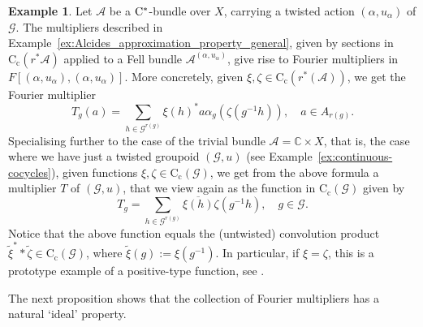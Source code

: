 \documentclass[11 pt, leqno]{amsart}
\numberwithin{equation}{section}
\theoremstyle{plain}
\theoremstyle{definition}
\newtheorem{ex}[thm]{Example}
\newcommand*{\contc}{\mathrm{C_c}}%
\newcommand{\G}{\mathcal G} %
\newcommand{\A}{\mathcal A}
\newcommand{\C}{\mathbb C}
\newcommand{\cst}{\ifmmode\mathrm{C}^*\else{$\mathrm{C}^*$}\fi}
\begin{document}
\begin{ex}\label{ex:approximation_property_maps_as_Fouriers}
Let $\A$ be a $\cst$-bundle over $X$, carrying a twisted action $(\alpha,u_\alpha)$ of $\G$. 
The multipliers described in Example~\ref{ex:Alcides_approximation_property_general}, given by sections in $\contc(r^*\A)$ applied to a Fell bundle $\A^{(\alpha,u_{\alpha})}$, give rise to Fourier multipliers in $F[(\alpha,u_{\alpha}),(\alpha,u_{\alpha})]$. 
More concretely, given $\xi,\zeta\in \contc(r^*(\A))$, we get the Fourier multiplier 
\[
    T_g(a)=\sum_{h\in \G^{r(g)}}\xi(h)^*a\alpha_g(\zeta(g^{-1}h)),\quad a\in A_{r(g)} .
\]
Specialising further to the case of the trivial bundle $\A=\C\times X$, that is, the case where we have just a twisted groupoid $(\G,u)$ (see Example~\ref{ex:continuous-cocycles}), given functions $\xi,\zeta\in \contc(\G)$, we get from the above formula a multiplier $T$ of $(\G,u)$, that we view again as the function in $\contc(\G)$ given by 
\[
    T_g = \sum_{h\in \G^{r(g)}}\overline{\xi(h)}\zeta(g^{-1}h),\quad g\in \G.
\]
Notice that the above function equals the (untwisted) convolution product $\tilde\xi^**\tilde\zeta\in \contc(\G)$, where $\tilde\xi(g):=\xi(g^{-1})$.
In particular, if $\xi=\zeta$, this is a prototype example of a positive-type function, see \cite[Definition~5.6.15]{BO}.
\end{ex}

The next proposition shows that the collection of Fourier multipliers has a natural `ideal' property.
\end{document}
